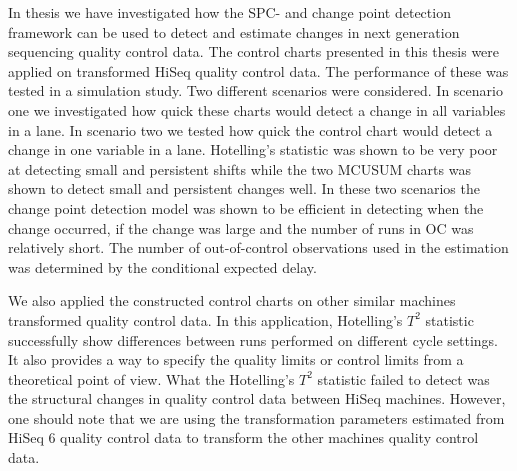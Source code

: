 
In thesis we have investigated how the SPC- and change point detection framework can be used to detect and estimate changes in next generation sequencing quality control data. The control charts presented in this thesis were applied on transformed HiSeq quality control data. The performance of these was tested in a simulation study. Two different scenarios were considered. In scenario one we investigated how quick these charts would detect a change in all variables in a lane. In scenario two we tested how quick the control chart would detect a change in one variable in a lane. Hotelling's statistic was shown to be very poor at detecting small and persistent shifts while the two MCUSUM charts was shown to detect small and persistent changes well. In these two scenarios the change point detection model was shown to be efficient in detecting when the change occurred, if the change was large and the number of runs in OC was relatively short. The number of out-of-control observations used in the estimation was determined by the conditional expected delay. 

We also applied the constructed control charts on other similar machines transformed quality control data. In this application, Hotelling's $T^2$ statistic successfully show differences between runs performed on different cycle settings. It also provides a way to specify the quality limits or control limits from a theoretical point of view. What the Hotelling's $T^2$ statistic failed to detect was the structural changes in quality control data between HiSeq machines. However, one should note that we are using the transformation parameters estimated from HiSeq 6 quality control data to transform the other machines quality control data. 


